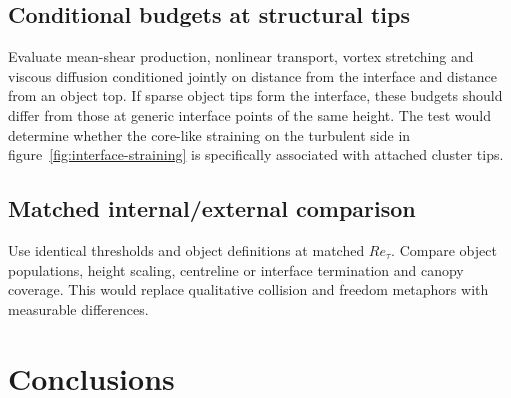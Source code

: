 \documentclass[11pt]{article}
\newcommand{\Rey}{\mathit{Re}}
\begin{document}
\subsection{Conditional budgets at structural tips}
Evaluate mean-shear production, nonlinear transport, vortex stretching and viscous diffusion conditioned jointly on distance from the interface and distance from an object top.  If sparse object tips form the interface, these budgets should differ from those at generic interface points of the same height.  The test would determine whether the core-like straining on the turbulent side in figure~\ref{fig:interface-straining} is specifically associated with attached cluster tips.

\subsection{Matched internal/external comparison}
Use identical thresholds and object definitions at matched $\Rey_\tau$. Compare object populations, height scaling, centreline or interface termination and canopy coverage.  This would replace qualitative collision and freedom metaphors with measurable differences.

\section{Conclusions}
\end{document}

